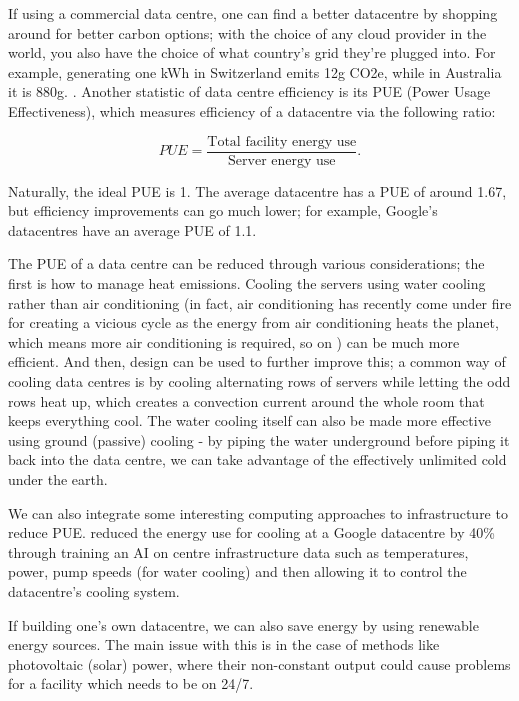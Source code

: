 \documentclass{article}
\begin{document}
If using a commercial data centre, one can find a better datacentre by shopping around for better carbon options; with the choice of any cloud provider in the world, you also have the choice of what country's grid they're plugged into. For example, generating one kWh in Switzerland emits 12g CO2e, while in Australia it is 880g. \citep{grealey2021carbon}. Another statistic of data centre efficiency is its PUE (Power Usage Effectiveness), which measures efficiency of a datacentre via the following ratio:

$$PUE = \frac{\textrm{Total facility energy use}}{\textrm{Server energy use}}.$$

Naturally, the ideal PUE is 1. The average datacentre has a PUE of around 1.67, but efficiency improvements can go much lower; for example, Google's datacentres have an average PUE of 1.1. \citep{holzle2020data}\newline

The PUE of a data centre can be reduced through various considerations; the first is how to manage heat emissions. Cooling the servers using water cooling rather than air conditioning (in fact, air conditioning has recently come under fire for creating a vicious cycle as the energy from air conditioning heats the planet, which means more air conditioning is required, so on \citep{ospina2018cooling}) can be much more efficient. And then, design can be used to further improve this; a common way of cooling data centres is by cooling alternating rows of servers while letting the odd rows heat up, which creates a convection current around the whole room that keeps everything cool. The water cooling itself can also be made more effective using ground (passive) cooling - by piping the water underground before piping it back into the data centre, we can take advantage of the effectively unlimited cold under the earth. \newline

We can also integrate some interesting computing approaches to infrastructure to reduce PUE. \citet{evans2016deepmind} reduced the energy use for cooling at a Google datacentre by 40\% through training an AI on centre infrastructure data such as temperatures, power, pump speeds (for water cooling) and then allowing it to control the datacentre's cooling system.\newline

If building one's own datacentre, we can also save energy by using renewable energy sources. The main issue with this is in the case of methods like photovoltaic (solar) power, where their non-constant output could cause problems for a facility which needs to be on 24/7.\newline
\end{document}

